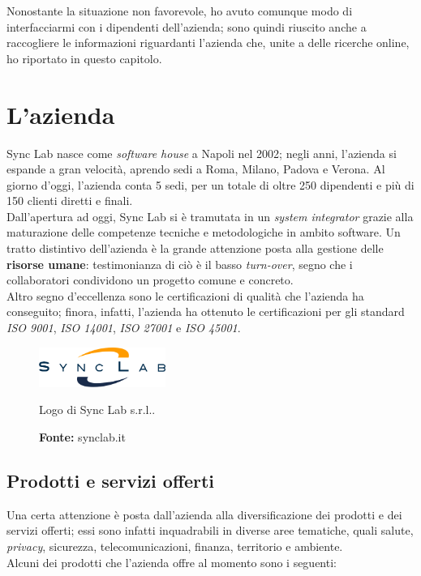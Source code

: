 Nonostante la situazione non favorevole, ho avuto comunque modo di interfacciarmi con i dipendenti dell'azienda; sono quindi riuscito anche a raccogliere le informazioni riguardanti l'azienda che, unite a delle ricerche online, ho riportato in questo capitolo.

\section{L'azienda}

Sync Lab nasce come \textit{software house} a Napoli nel 2002; negli anni, l'azienda si espande a gran velocità, aprendo sedi a Roma, Milano, Padova e Verona. Al giorno d'oggi, l'azienda conta 5 sedi, per un totale di oltre 250 dipendenti e più di 150 clienti diretti e finali. \\
Dall'apertura ad oggi, Sync Lab si è tramutata in un \textit{system integrator} grazie alla maturazione delle competenze tecniche e metodologiche in ambito software. Un tratto distintivo dell'azienda è la grande attenzione posta alla gestione delle \textbf{risorse umane}: testimonianza di ciò è il basso \textit{turn-over}, segno che i collaboratori condividono un progetto comune e concreto. \\
Altro segno d'eccellenza sono le certificazioni di qualità che l'azienda ha conseguito; finora, infatti, l'azienda ha ottenuto le certificazioni per gli standard \textit{ISO 9001}, \textit{ISO 14001}, \textit{ISO 27001} e \textit{ISO 45001}. \\

\begin{figure}[htbp]
  \begin{center}
    \includegraphics[height=1.3cm]{immagini/synclab-logo}
  \end{center}
  \caption{Logo di Sync Lab s.r.l..}
  \caption*{\textbf{Fonte:} synclab.it}
\end{figure}

\subsection*{Prodotti e servizi offerti}

Una certa attenzione è posta dall'azienda alla diversificazione dei prodotti e dei servizi offerti; essi sono infatti inquadrabili in diverse aree tematiche, quali salute, \textit{privacy}, sicurezza, telecomunicazioni, finanza, territorio e ambiente. \\
Alcuni dei prodotti che l'azienda offre al momento sono i seguenti:

